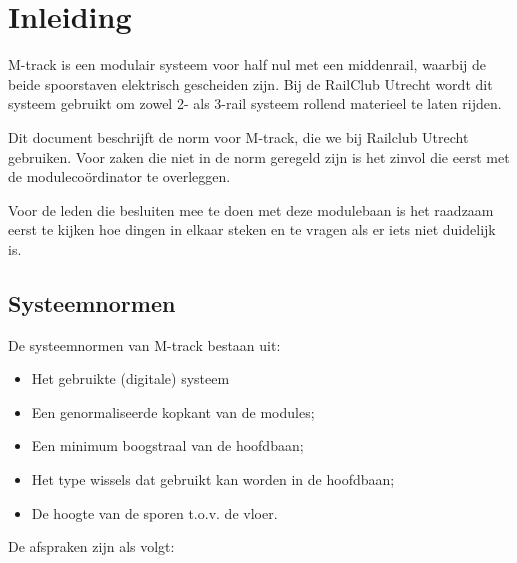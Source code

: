\documentclass[12pt,a4paper]{report}
\begin{document}
\chapter{Inleiding}
\label{ch:normen}
M-track is een modulair systeem voor half nul met een middenrail, waarbij de beide spoorstaven elektrisch gescheiden zijn. Bij de RailClub Utrecht wordt dit systeem gebruikt om zowel 2- als 3-rail systeem rollend materieel te laten rijden.

Dit document beschrijft de norm voor M-track, die we bij Railclub Utrecht gebruiken. Voor zaken die niet in de norm geregeld zijn is het zinvol die eerst met de moduleco\"{o}rdinator te overleggen.

Voor de leden die besluiten mee te doen met deze modulebaan is het raadzaam eerst te kijken hoe dingen in elkaar steken en te vragen als er iets niet duidelijk is.

\section{Systeemnormen}
De systeemnormen van M-track bestaan uit:
\begin{itemize}
\item Het gebruikte (digitale) systeem
\item Een genormaliseerde kopkant van de modules;
\item Een minimum boogstraal van de hoofdbaan;
\item Het type wissels dat gebruikt kan worden in de hoofdbaan;
\item De hoogte van de sporen t.o.v. de vloer.
\end{itemize}

De afspraken zijn als volgt:
\end{document}
